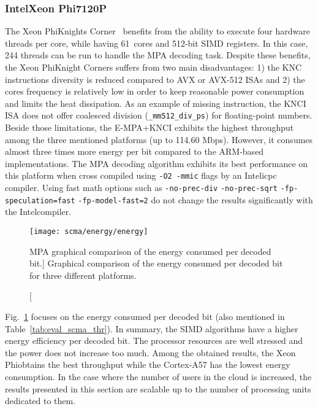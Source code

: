 \subsubsection{Intel\R Xeon Phi\TM 7120P}

The Xeon Phi\TM Knights Corner~\cite{Chrysos2012} benefits from the ability to
execute four hardware threads per core, while having 61~cores and 512-bit SIMD
registers. In this case, 244 threads can be run to handle the MPA decoding task.
Despite these benefits, the Xeon Phi\TM Knight Corners suffers from two main
disadvantages: 1) the KNC instructions diversity is reduced compared to AVX or
AVX-512 ISAs and 2) the cores frequency is relatively low in order to keep
reasonable power consumption and limits the heat dissipation. As an example of
missing instruction, the KNCI ISA does not offer coalesced division
(\verb|_mm512_div_ps|) for floating-point numbers. Beside those limitations,
the E-MPA+KNCI exhibits the highest throughput among the three mentioned
platforms (up to 114.60 Mbps). However, it consumes almost three times more
energy per bit compared to the ARM\R-based implementations. The MPA decoding
algorithm exhibits its best performance on this platform when cross compiled
using \verb|-O2 -mmic| flags by an Intel\R icpc compiler. Using fast math
options such as \verb|-no-prec-div| \verb|-no-prec-sqrt|
\verb|-fp-speculation=fast| \verb|-fp-model-fast=2| do not change the results
significantly with the Intel\R compiler.

\begin{figure}[htp]
  \centering
  \texttt{[image: scma/energy/energy]}
  \caption
    [MPA graphical comparison of the energy consumed per decoded bit.]
    {Graphical comparison of the energy consumed per decoded bit for
    three different platforms.}
  \label{plot:eval_scma_energy}
\end{figure}

Fig.~\ref{plot:eval_scma_energy} focuses on the energy consumed per decoded bit
(also mentioned in Table~\ref{tab:eval_scma_thr}). In summary, the SIMD
algorithms have a higher energy efficiency per decoded bit. The processor
resources are well stressed and the power does not increase too much. Among the
obtained results, the Xeon Phi\TM obtains the best throughput while the
Cortex-A57 has the lowest energy consumption. In the case where the number of
users in the cloud is increased, the results presented in this section are
scalable up to the number of processing units dedicated to them.

